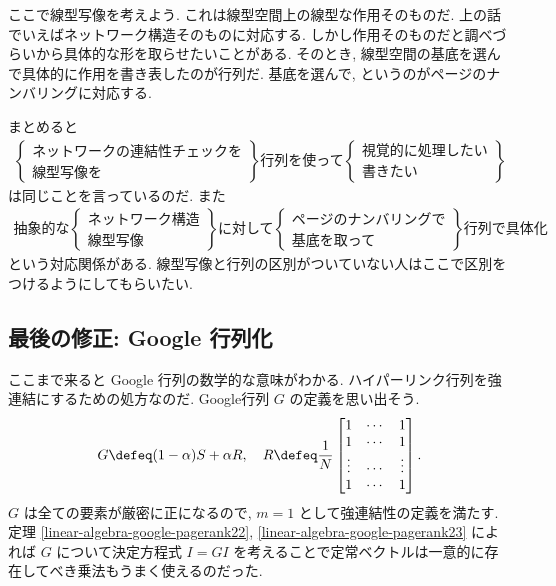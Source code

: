 \documentclass[openany, a4paper, oneside]{jsbook}
\begin{document}
ここで線型写像を考えよう.
これは線型空間上の線型な作用そのものだ.
上の話でいえばネットワーク構造そのものに対応する.
しかし作用そのものだと調べづらいから具体的な形を取らせたいことがある.
そのとき, 線型空間の基底を選んで具体的に作用を書き表したのが行列だ.
基底を選んで, というのがページのナンバリングに対応する.

まとめると
\begin{align}
 \begin{Bmatrix}
  \text{ネットワークの連結性チェックを} \\
  \text{線型写像を}
 \end{Bmatrix}
 \text{行列を使って}
 \begin{Bmatrix}
  \text{視覚的に処理したい} \\
  \text{書きたい}
 \end{Bmatrix}
\end{align}
は同じことを言っているのだ.
また
\begin{align}
 \text{抽象的な}
 \begin{Bmatrix}
  \text{ネットワーク構造} \\
  \text{線型写像}
 \end{Bmatrix}
 \text{に対して}
 \begin{Bmatrix}
  \text{ページのナンバリングで} \\
  \text{基底を取って}
 \end{Bmatrix}
 \text{行列で具体化}
\end{align}
という対応関係がある.
線型写像と行列の区別がついていない人はここで区別をつけるようにしてもらいたい.
\subsection{最後の修正: Google 行列化}

ここまで来ると Google 行列の数学的な意味がわかる.
ハイパーリンク行列を強連結にするための処方なのだ.
Google行列 $G$ の定義を思い出そう.
\begin{align}
 G
 \defeq
 (1 - \alpha) S + \alpha R, \quad
 R
 \defeq
 \frac{1}{N}
 \begin{bmatrix}
  1      & \cdots & 1 \\
  1      & \cdots & 1 \\
  \vdots & \cdots & \vdots \\
  1      & \cdots & 1
 \end{bmatrix}.
\end{align}
$G$ は全ての要素が厳密に正になるので, $m=1$ として強連結性の定義を満たす.
定理 \ref{linear-algebra-google-pagerank22}, \ref{linear-algebra-google-pagerank23} によれば
$G$ について決定方程式 $I=GI$ を考えることで定常ベクトルは一意的に存在してべき乗法もうまく使えるのだった.
\end{document}
